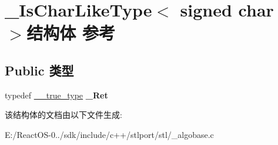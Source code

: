 \hypertarget{struct___is_char_like_type_3_01signed_01char_01_4}{}\section{\+\_\+\+Is\+Char\+Like\+Type$<$ signed char $>$结构体 参考}
\label{struct___is_char_like_type_3_01signed_01char_01_4}
\subsection*{Public 类型}
\begin{DoxyCompactItemize}
\item 
\mbox{\label{struct___is_char_like_type_3_01signed_01char_01_4_ab5bb8cc86e0048321b705b0361273267}} 
typedef \hyperlink{struct____true__type}{\+\_\+\+\_\+true\+\_\+type} {\bfseries \+\_\+\+Ret}
\end{DoxyCompactItemize}


该结构体的文档由以下文件生成\+:\begin{DoxyCompactItemize}
\item 
E\+:/\+React\+O\+S-\/0../sdk/include/c++/stlport/stl/\+\_\+algobase.\+c\end{DoxyCompactItemize}
